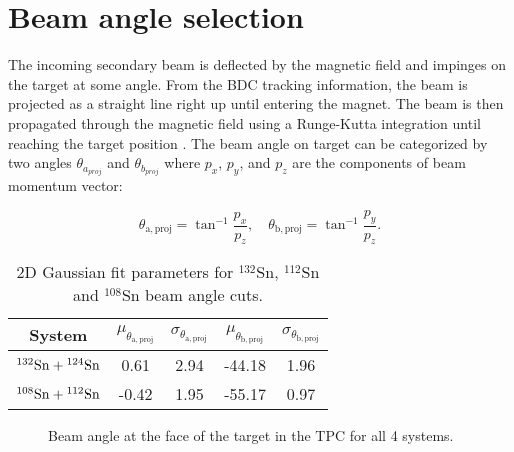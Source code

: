 \section{Beam angle selection}
\label{sec:beamangle}
The incoming secondary beam is deflected by the magnetic field and impinges on the target at some angle. From the BDC tracking information, the beam is projected as a straight line right up until entering the magnet.  The beam is then propagated through the magnetic field using a Runge-Kutta integration until reaching the target position \cite{jon}. The beam angle on target can be categorized by two angles $\theta_{a_{proj}}$ and $\theta_{b_{proj}}$ where $p_x$, $p_y$, and $p_z$ are the components of beam momentum vector:


\begin{equation}
  \theta_\mathrm{a,proj}=\tan^{-1}\frac{p_x}{p_z},\quad
  \theta_\mathrm{b,proj}=\tan^{-1}\frac{p_y}{p_z}.
  \label{beamAngle}
\end{equation}





\begin{table}[!htb]
  \begin{center}
    \begin{tabular}{ccccc}
      \hline 
      System & $\mu_{\theta_\mathrm{a,proj}}$ &
      $\sigma_{\theta_\mathrm{a,proj}}$ & $\mu_{\theta_\mathrm{b,proj}}$ &
      $\sigma_{\theta_\mathrm{b,proj}}$ \\
      \hline\hline 
      ${}^{132}\mathrm{Sn} + {}^{124}\mathrm{Sn}$ & 0.61 & 2.94 & -44.18 & 1.96 \\
      ${}^{108}\mathrm{Sn} + {}^{112}\mathrm{Sn}$ & -0.42 & 1.95 & -55.17 & 0.97 \\
      \hline
    \end{tabular}
    \caption{2D Gaussian fit parameters for $^{132}$Sn, $^{112}$Sn and
      $^{108}$Sn beam angle cuts. \label{beamAngleParameters}}
  \end{center}
\end{table}


\begin{figure}[!htb]%
    \centering
    \qquad
    
    \qquad

	\caption{Beam angle at the face of the target in the TPC for all 4 systems.}
	\label{fig:beamangle}
\end{figure}


